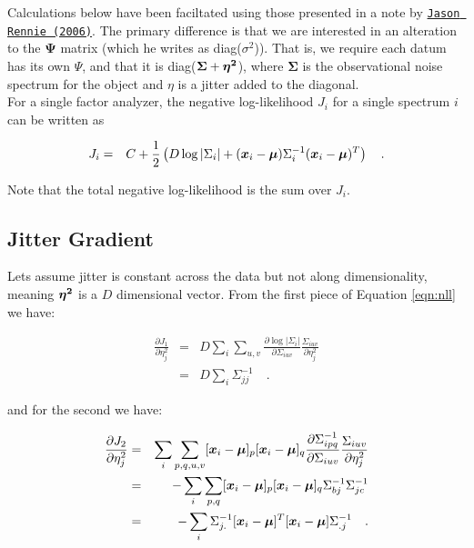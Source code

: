 \documentclass[12pt,preprint]{aastex}
\newcommand{\mbf}[1]{\boldsymbol{#1}}
\newcommand{\ps}{\mbf{\Psi}}
\newcommand{\sig}{\mbf{\Sigma}}
\begin{document}
\vspace{12pt}
Calculations below have been faciltated using those presented 
in a note by {\tt \href{http://bit.ly/11JqOFK}{Jason Rennie (2006)}}.
The primary difference is that we are interested in an alteration to
the $\ps$ matrix (which he writes as diag($\sigma^2$)).  That is, 
we require each datum has its own $\Psi$, and that it is 
diag($\sig+\et$), where $\sig$ is the
observational noise spectrum for the object and $\eta$ is a jitter
added to the diagonal. \\

For a single factor analyzer, the negative log-likelihood $J_i$ for a single spectrum $i$ can be
written as

\begin{eqnarray}\displaystyle
J_{i} &=& C + \frac{1}{2}\left(D\log|\Sigma_i| + (\data_i-\mean)\Sigma_i^{-1}(\data_i-\mean)^T\right)
\quad .
\label{eqn:nll}
\end{eqnarray}

Note that the total negative log-likelihood is the sum over $J_i$.

\subsection{Jitter Gradient}

Lets assume jitter is constant across the data but not along
dimensionality, meaning $\et$ is a $D$ dimensional vector.  From the
first piece of Equation \ref{eqn:nll} we have:

\begin{eqnarray}\displaystyle
\frac{\partial J_1}{\partial \eta_j^2} &=& D\sum_i \sum_{u,v}
\frac{\partial \log|\Sigma_i|}{\partial
  \Sigma_{iuv}}\frac{\Sigma_{iuv}}{\partial \eta_j^2} \\
&=& D \sum_i \Sigma_{jj}^{-1}
\quad .
\label{eqn:gradjit1}
\end{eqnarray}

and for the second we have:

\begin{eqnarray}\displaystyle
\frac{\partial J_2}{\partial \eta_j^2} &=& \sum_i \sum_{p,q,u,v}
[\data_i-\mean]_p [\data_i-\mean]_q\frac{\partial \Sigma^{-1}_{ipq}}{\partial
  \Sigma_{iuv}}\frac{\Sigma_{iuv}}{\partial \eta_j^2} \\
&=& -\sum_i \sum_{p,q}[\data_i-\mean]_p [\data_i-\mean]_q\Sigma_{bj}^{-1}\Sigma_{jc}^{-1}\\
&=& -\sum_i \Sigma_{j.}^{-1}[\data_i-\mean]^T [\data_i-\mean]\Sigma_{.j}^{-1}
\quad .
\label{eqn:gradjit2}
\end{eqnarray}
\end{document}
